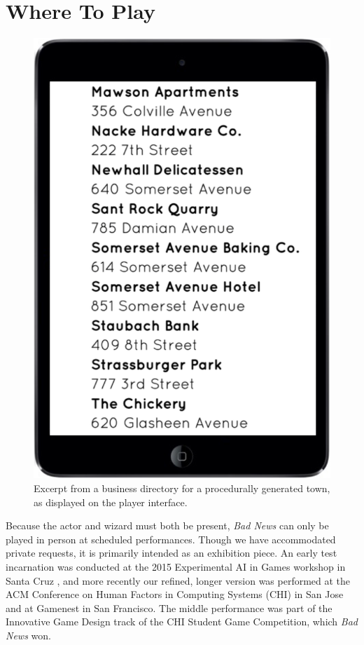 \documentclass[letterpaper]{article}
\begin{document}
\vspace{-0.4em}
\section{Where To Play}

\begin{figure}[t]
  \centering
  \includegraphics[width=0.42\columnwidth]{player_interface.png}
  \caption{Excerpt from a business directory for a procedurally generated town, as displayed on the player interface.}
  \label{fig:player_interface}
\end{figure}

Because the actor and wizard must both be present, \textit{Bad News} can only be played in person at scheduled performances. Though we have accommodated private requests, it is primarily intended as an exhibition piece. An early test incarnation was conducted at the 2015 Experimental AI in Games workshop in Santa Cruz \cite{ryan2015bad}, and more recently our refined, longer version was performed at the ACM Conference on Human Factors in Computing Systems (CHI) in San Jose \cite{ryan2016bad} and at Gamenest in San Francisco. The middle performance was part of the Innovative Game Design track of the CHI Student Game Competition, which \textit{Bad News} won.

\vspace{-0.4em}


\end{document}
